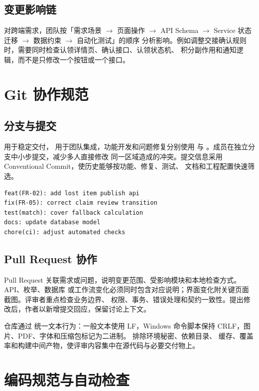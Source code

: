 \subsection{变更影响链}

对跨端需求，团队按「需求场景 $\rightarrow$ 页面操作 $\rightarrow$ API Schema
$\rightarrow$ Service 状态迁移 $\rightarrow$ 数据约束 $\rightarrow$ 自动化测试」的顺序
分析影响。例如调整交接确认规则时，需要同时检查认领详情页、确认接口、认领状态机、
积分副作用和通知逻辑，而不是只修改一个按钮或一个接口。

\section{Git 协作规范}

\subsection{分支与提交}

 用于稳定交付， 用于团队集成，功能开发和问题修复分别使用
 与 。成员在独立分支中小步提交，减少多人直接修改
同一区域造成的冲突。提交信息采用 Conventional Commit，使历史能够按功能、修复、测试、
文档和工程配置快速筛选。

\begin{verbatim}
feat(FR-02): add lost item publish api
fix(FR-05): correct claim review transition
test(match): cover fallback calculation
docs: update database model
chore(ci): adjust automated checks
\end{verbatim}

\subsection{Pull Request 协作}

Pull Request 关联需求或问题，说明变更范围、受影响模块和本地检查方式。API、枚举、数据库
或工作流变化必须同时包含对应说明；界面变化附关键页面截图。评审者重点检查业务边界、
权限、事务、错误处理和契约一致性。提出修改后，作者以新增提交回应，保留讨论上下文。

仓库通过  统一文本行为：一般文本使用 LF，Windows 命令脚本保持
CRLF，图片、PDF、字体和压缩包标记为二进制。 排除环境秘密、依赖目录、
缓存、覆盖率和构建中间产物，使评审内容集中在源代码与必要交付物上。

\section{编码规范与自动检查}


